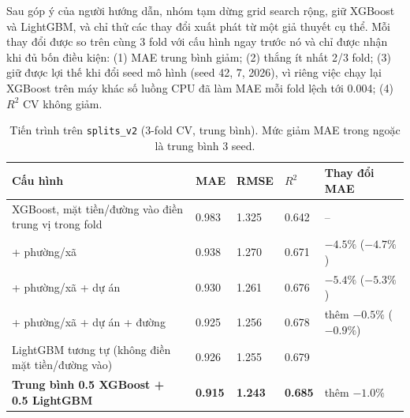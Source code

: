 \documentclass[11pt]{article}
\begin{document}
Sau góp ý của người hướng dẫn, nhóm tạm dừng grid search rộng, giữ XGBoost và LightGBM, và chỉ thử các thay đổi
xuất phát từ một giả thuyết cụ thể. Mỗi thay đổi được so trên cùng 3 fold với cấu hình ngay trước nó và chỉ được
nhận khi đủ bốn điều kiện: (1) MAE trung bình giảm; (2) thắng ít nhất 2/3 fold; (3) giữ được lợi thế khi đổi seed
mô hình (seed 42, 7, 2026), vì riêng việc chạy lại XGBoost trên máy khác số luồng CPU đã làm MAE mỗi fold lệch tới
0.004; (4) $R^2$ CV không giảm.

\begin{table}[H]
\centering
\small
\caption{Tiến trình trên \texttt{splits\_v2} (3-fold CV, trung bình). Mức giảm MAE trong ngoặc là trung bình 3 seed.}
\begin{tabular}{@{}L{0.43\textwidth}L{0.10\textwidth}L{0.10\textwidth}L{0.09\textwidth}L{0.15\textwidth}@{}}
\toprule
\textbf{Cấu hình} & \textbf{MAE} & \textbf{RMSE} & \textbf{$R^2$} & \textbf{Thay đổi MAE} \\
\midrule
XGBoost, mặt tiền/đường vào điền trung vị trong fold & 0.983 & 1.325 & 0.642 & -- \\
\quad + phường/xã & 0.938 & 1.270 & 0.671 & $-4.5\%$ ($-4.7\%$) \\
\quad + phường/xã + dự án & 0.930 & 1.261 & 0.676 & $-5.4\%$ ($-5.3\%$) \\
\quad + phường/xã + dự án + đường & 0.925 & 1.256 & 0.678 & thêm $-0.5\%$ ($-0.9\%$) \\
LightGBM tương tự (không điền mặt tiền/đường vào) & 0.926 & 1.255 & 0.679 & \\
\textbf{Trung bình 0.5 XGBoost + 0.5 LightGBM} & \textbf{0.915} & \textbf{1.243} & \textbf{0.685} & thêm $-1.0\%$ \\
\bottomrule
\end{tabular}
\end{table}
\end{document}
